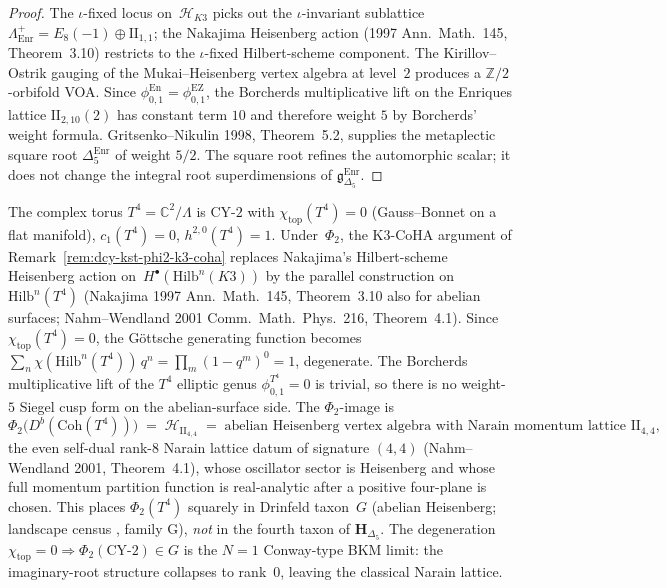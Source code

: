 \begin{proof}
The $\iota$-fixed locus on~$\mathcal{H}_{K3}$ picks out the
$\iota$-invariant sublattice
$\Lambda_{\mathrm{Enr}}^+ = E_8(-1)\oplus\mathrm{II}_{1,1}$; the
Nakajima Heisenberg action (1997 \textup{Ann.~Math.}~145,
Theorem~3.10) restricts to the $\iota$-fixed Hilbert-scheme
component. The Kirillov--Ostrik gauging of the Mukai--Heisenberg
vertex algebra at level~$2$ produces a $\mathbb{Z}/2$-orbifold
VOA. Since
\(\phi^{\mathrm{En}}_{0,1}=\phi^{\mathrm{EZ}}_{0,1}\), the Borcherds
multiplicative lift on the Enriques lattice
\(\mathrm{II}_{2,10}(2)\) has constant term \(10\) and therefore weight
\(5\) by Borcherds' weight formula. Gritsenko--Nikulin 1998,
Theorem~5.2, supplies the metaplectic square root
\(\Delta_5^{\mathrm{Enr}}\) of weight \(5/2\). The square root refines
the automorphic scalar; it does not change the integral root
superdimensions of
\(\mathfrak{g}_{\Delta_5}^{\mathrm{Enr}}\).
\end{proof}

\begin{remark}
\label{rem:dcy-t4-abelian}
The complex torus $T^4 = \mathbb{C}^2/\Lambda$ is CY-$2$ with
$\chi_{\mathrm{top}}(T^4) = 0$ (Gauss--Bonnet on a flat manifold),
$c_1(T^4) = 0$, $h^{2,0}(T^4) = 1$. Under~$\Phi_2$, the K3-CoHA
argument of Remark~\ref{rem:dcy-kst-phi2-k3-coha} replaces
Nakajima's Hilbert-scheme Heisenberg action
on~$H^\bullet(\mathrm{Hilb}^n(K3))$ by the parallel construction on
$\mathrm{Hilb}^n(T^4)$ (Nakajima 1997 \textup{Ann.~Math.}~145,
Theorem~3.10 also for abelian surfaces; Nahm--Wendland 2001
\textup{Comm.~Math.~Phys.}~216, Theorem~4.1). Since
$\chi_{\mathrm{top}}(T^4) = 0$, the G\"ottsche generating function
becomes
$\sum_n \chi(\mathrm{Hilb}^n(T^4))\,q^n = \prod_m(1-q^m)^0 = 1$,
degenerate. The Borcherds multiplicative lift of the $T^4$
elliptic genus $\phi_{0,1}^{T^4} = 0$ is trivial, so there is no
weight-$5$ Siegel cusp form on the abelian-surface side. The
$\Phi_2$-image is
\[
 \Phi_2\bigl(D^b(\mathrm{Coh}(T^4))\bigr)
 \;=\;
 \mathcal H_{\mathrm{II}_{4,4}}
 \;=\;
 \text{abelian Heisenberg vertex algebra with Narain momentum lattice }\mathrm{II}_{4,4},
\]
the even self-dual rank-$8$ Narain lattice datum of signature
$(4,4)$ (Nahm--Wendland 2001, Theorem~4.1), whose oscillator sector is
Heisenberg and whose full momentum partition function is real-analytic
after a positive four-plane is chosen. This places
$\Phi_2(T^4)$ squarely in Drinfeld taxon~$G$ (abelian Heisenberg;
landscape census \cite{VolI}, family G),
\emph{not} in the fourth taxon of $\mathbf{H}_{\Delta_5}$. The
degeneration $\chi_{\mathrm{top}} = 0 \Rightarrow \Phi_2(\text{CY-}2)\in G$
is the $N = 1$ Conway-type BKM limit: the imaginary-root structure
collapses to rank~$0$, leaving the classical Narain lattice.
\end{remark}

